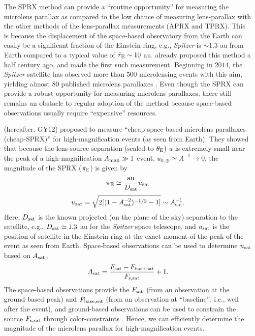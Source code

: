 \documentclass[10pt]{emulateapj}
\begin{document}
 The SPRX method can provide a ``routine opportunity'' for measuring the microlens parallax as 
compared to the low chance of measuring lens-parallax with the other methods of the lens-parallax 
measurements (APRX and TPRX). This is because the displacement of the space-based observatory from 
the Earth can easily be a significant fraction of the Einstein ring, e.g., {\it Spitzer} is 
$\sim 1.3$ au from Earth compared to a typical value of $\tilde{r}_{\rm E} \sim 10$ au.
\citet{refsdal66} already proposed this method a half century ago, and \citet{dong07} made 
the first such measurement. Beginning in $2014$, the {\it Spitzer} satellite has observed 
more than $500$ microlensing events with this aim, yielding almost $80$ published microlens 
parallaxes \citep{bozza16, calchi15a, chung17, han16, han17, poleski16, ryu18, shin17, 
shvartzvald15, shvartzvald16, shvartzvald17, street16, udalski15b, wang17, yee15a, zhu15, 
zhu16, zhu17}. Even though the SPRX can provide a robust opportunity for measuring microlens 
parallaxes, there still remains an obstacle to regular adoption of the method because space-based 
observations usually require ``expensive'' resources.

 \citet{gould12} (hereafter, GY12) proposed to measure ``cheap space-based microlens parallaxes 
(cheap-SPRX)'' for high-magnification events (as seen from Earth). They showed that because the 
lens-source separation (scaled to $\theta_{\rm E}$) $u$ is extremely small near the peak of 
a high-magnification $A_{\rm max}\gg 1$ event, $u_{0,\oplus}\simeq A^{-1}\rightarrow 0$, the 
magnitude of the SPRX ($\pi_{\rm E}$) is given by 
\begin{equation}
\pi_{\rm E} \simeq {{\rm au} \over D_{\rm sat}}u_{\rm sat}
\end{equation}
\begin{equation}
u_{\rm sat} = \sqrt{2[(1-A_{\rm sat}^{-2})^{-1/2}-1]} \sim A_{\rm sat}^{-1}.
\end{equation}
Here, $D_{\rm sat}$ is the known projected (on the plane of the sky) separation to the satellite, 
e.g., $D_{\rm sat} \simeq 1.3$ au for the {\it Spitzer} space telescope, and $u_{\rm sat}$ is the 
position of satellite in the Einstein ring at the exact moment of the peak of the event as seen 
from Earth. Space-based observations can be used to determine $u_{\rm sat}$ based on $A_{\rm sat}$,
\begin{equation}
A_{\rm sat} = {{F_{\rm sat} - F_{\rm base,sat}} \over F_{\rm s,sat}} + 1.
\end{equation}
The space-based observations provide the $F_{\rm sat}$ (from an observation at the ground-based peak) 
and $F_{\rm base,sat}$ (from an observation at ``baseline'', i.e., well after the event), and 
ground-based observations can be used to constrain the source $F_{\rm s,sat}$ through color-constraints 
\citep{calchi15b,gould10a}. Hence, we can efficiently determine the magnitude of the microlens parallax 
for high-magnification events.
\end{document}
